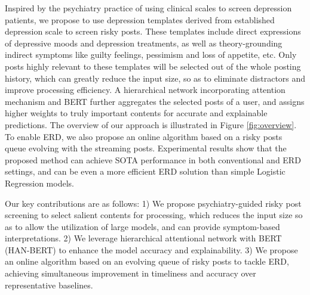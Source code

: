 Inspired by the psychiatry practice of using clinical scales to screen depression patients, we propose to use depression templates derived from established depression scale \cite{beck1996beck} to screen risky posts. These templates include direct expressions of depressive moods and depression treatments, as well as theory-grounding indirect symptoms like guilty feelings, pessimism and loss of appetite, etc. Only posts highly relevant to these templates will be selected out of the whole posting history, which can greatly reduce the input size, so as to eliminate distractors and improve processing efficiency. A hierarchical network incorporating attention mechanism \cite{yang2016hierarchical} and BERT \cite{devlin2018bert} further aggregates the selected posts of a user, and assigns higher weights to truly important contents for accurate and explainable predictions. The overview of our approach is illustrated in Figure \ref{fig:overview}. To enable ERD, we also propose an online algorithm based on a risky posts queue evolving with the streaming posts. Experimental results show that the proposed method can achieve SOTA performance in both conventional and ERD settings, and can be even a more efficient ERD solution than simple Logistic Regression models.

Our key contributions are as follows: 
1) We propose psychiatry-guided risky post screening to select salient contents for processing, which reduces the input size so as to allow the utilization of large models, and can provide symptom-based interpretations.
2) We leverage hierarchical attentional network with BERT (HAN-BERT) to enhance the model accuracy and explainability.
3) We propose an online algorithm based on an evolving queue of risky posts to tackle ERD, achieving simultaneous improvement in timeliness and accuracy over representative baselines. 
